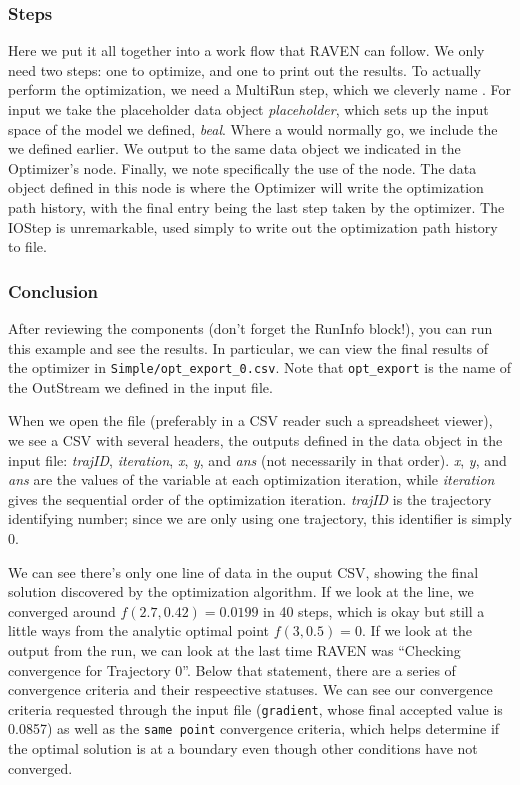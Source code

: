 \subsubsection{Steps}
Here we put it all together into a work flow that RAVEN can follow.  We only need two steps: one to optimize,
and one to print out the results.  To actually perform the optimization, we need a MultiRun step, which we
cleverly name .  For input we take the placeholder data object \emph{placeholder}, which sets
up the input space of the model we defined, \emph{beal}.  Where a  would normally go, we
include the  we defined earlier.  We output to the same data object we indicated in the
Optimizer's  node.  Finally, we note specifically the use of the
 node.  The data object defined in this node is where the Optimizer will write the
optimization path history, with the final entry being the last step taken by the optimizer.  The IOStep is
unremarkable, used simply to write out the optimization path history to file.

\subsubsection{Conclusion}
After reviewing the components (don't forget the RunInfo block!), you can run this example and see the
results.  In particular, we can view the final results of the optimizer in \texttt{Simple/opt\_export\_0.csv}.  Note
that \texttt{opt\_export} is the name of the  OutStream we defined in the input file.

When we open the file (preferably in a CSV reader such a spreadsheet viewer), we see a CSV with several headers,
the outputs defined in the data object in the input
file: \emph{trajID}, \emph{iteration}, \emph{x}, \emph{y}, and \emph{ans} (not necessarily in that order).  \emph{x},
\emph{y}, and \emph{ans} are the values of the variable at each optimization iteration, while
\emph{iteration} gives the sequential order of the optimization iteration. \emph{trajID} is the
trajectory identifying number; since we are only using one trajectory, this identifier is simply 0.

We can see there's only one line of data in the ouput CSV, showing the final solution discovered by
the optimization algorithm.
If we look at the line, we converged around $f(2.7, 0.42) = 0.0199$ in 40 steps, which is okay but still a little
ways from the analytic optimal point $f(3, 0.5) = 0$.  If we look at the output from the run, we can look at
the last time RAVEN was ``Checking convergence for Trajectory 0''.  Below that statement, there are a series
of convergence criteria and their respeective statuses.  We can see our convergence criteria
requested through the input file (\texttt{gradient}, whose final accepted value is 0.0857) as well
as the \texttt{same point} convergence criteria, which helps determine if the optimal solution is at
a boundary even though other conditions have not converged.

